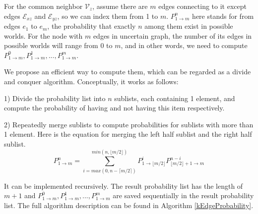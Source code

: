 \documentclass[\main/thesis.tex]{subfiles}
\begin{document}

For the common neighbor $\mathcal{V}_z$, assume there are $m$ edges connecting to it except edges $\mathcal{E}_{xz}$ and $\mathcal{E}_{yz}$, so we can index them from 1 to $m$. $P_{1\rightarrow m}^n$ here stands for from edges $e_1$ to $e_m$, the probability that exactly $n$ among them exist in possible worlds. For the node with $m$ edges in uncertain graph, the number of its edges in possible worlds will range from 0 to $m$, and in other words, we need to compute $P_{1\rightarrow m}^0, P_{1\rightarrow m}^1, ..., P_{1\rightarrow m}^m$. 

We propose an efficient way to compute them, which can be regarded as a divide and conquer algorithm. Conceptually, it works as follows:

1) Divide the probability list into $n$ sublists, each containing 1 element, and compute the probability of having and not having this item respectively.

2) Repeatedly merge sublists to compute probabilities for sublists with more than 1 element. Here is the equation for merging the left half sublist and the right half sublist.
\begin{equation}
P_{1\rightarrow m}^n=\sum_{i=max(0,n-\lceil m/2 \rceil)}^{min(n,\lfloor m/2 \rfloor)}P_{1\rightarrow{\lfloor m/2 \rfloor}}^i P_{{\lfloor m/2 \rfloor}+1\rightarrow m}^{n-i}
\label{divide-conquer-specific}
\end{equation}

It can be implemented recursively. The result probability list has the length of $m+1$ and $P_{1\rightarrow m}^0, P_{1\rightarrow m}^1, ..., P_{1\rightarrow m}^m$ are saved sequentially in the result probability list. The full algorithm description can be found in Algorithm \ref{kEdgeProbability}.
\end{document}
